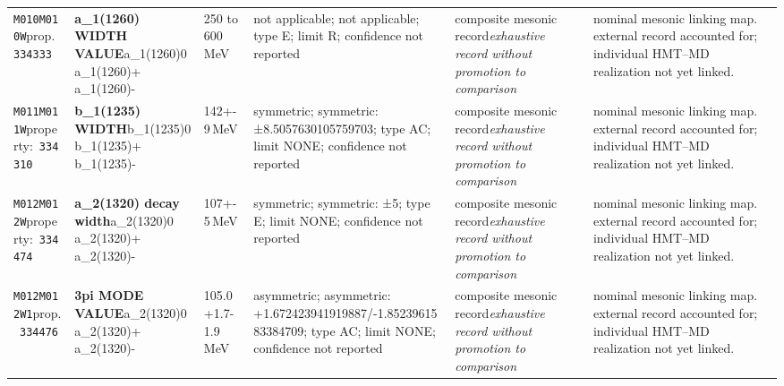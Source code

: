 \begin{landscape}
\begin{longtable}{L{1.85cm}L{4.45cm}L{2.35cm}L{4.05cm}L{3.35cm}L{7.15cm}}
\texttt{M010}\newline \texttt{M010W}\newline prop.\ \texttt{334333} & \textbf{a\_\allowbreak{}1(1260) WIDTH VALUE}\newline a\_\allowbreak{}1(1260)0 \textbar{}\allowbreak{} a\_\allowbreak{}1(1260)+ \textbar{}\allowbreak{} a\_\allowbreak{}1(1260)- & 250 to 600\,MeV & not applicable; not applicable; type E; limit R; confidence not reported & composite mesonic record\newline \emph{exhaustive record without promotion to comparison} & nominal mesonic linking map. external record accounted for; individual HMT--MD realization not yet linked. \\
\texttt{M011}\newline \texttt{M011W}\newline property:\ \texttt{334310} & \textbf{b\_\allowbreak{}1(1235) WIDTH}\newline b\_\allowbreak{}1(1235)0 \textbar{}\allowbreak{} b\_\allowbreak{}1(1235)+ \textbar{}\allowbreak{} b\_\allowbreak{}1(1235)- & 142+-9\,MeV & symmetric; symmetric: ±8.5057630105759703; type AC; limit NONE; confidence not reported & composite mesonic record\newline \emph{exhaustive record without promotion to comparison} & nominal mesonic linking map. external record accounted for; individual HMT--MD realization not yet linked. \\
\texttt{M012}\newline \texttt{M012W}\newline property:\ \texttt{334474} & \textbf{a\_\allowbreak{}2(1320) decay width}\newline a\_\allowbreak{}2(1320)0 \textbar{}\allowbreak{} a\_\allowbreak{}2(1320)+ \textbar{}\allowbreak{} a\_\allowbreak{}2(1320)- & 107+-5\,MeV & symmetric; symmetric: ±5; type E; limit NONE; confidence not reported & composite mesonic record\newline \emph{exhaustive record without promotion to comparison} & nominal mesonic linking map. external record accounted for; individual HMT--MD realization not yet linked. \\
\texttt{M012}\newline \texttt{M012W1}\newline prop.\ \texttt{334476} & \textbf{3pi MODE VALUE}\newline a\_\allowbreak{}2(1320)0 \textbar{}\allowbreak{} a\_\allowbreak{}2(1320)+ \textbar{}\allowbreak{} a\_\allowbreak{}2(1320)- & 105.0+1.7-1.9\,MeV & asymmetric; asymmetric: +1.672423941919887/-1.8523961583384709; type AC; limit NONE; confidence not reported & composite mesonic record\newline \emph{exhaustive record without promotion to comparison} & nominal mesonic linking map. external record accounted for; individual HMT--MD realization not yet linked. \\

\end{longtable}
\end{landscape}
